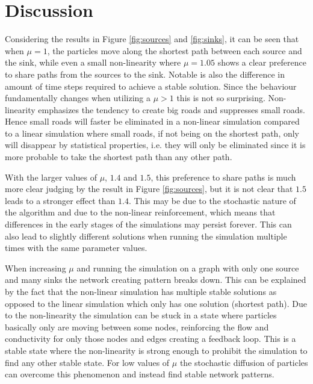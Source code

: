 \section{Discussion}
\label{sec:discussion}
Considering the results in Figure \ref{fig:sources} and \ref{fig:sinks}, it can be seen that when $\mu = 1$, the particles move along the shortest path between each source and the sink, while even a small non-linearity where $\mu = 1.05$ shows a clear preference to share paths from the sources to the sink. Notable is also the difference in amount of time steps required to achieve a stable solution. Since the behaviour fundamentally changes when utilizing a $\mu > 1$ this is not so surprising. Non-linearity emphasizes the tendency to create big roads and suppresses small roads. Hence small roads will faster be eliminated in a non-linear simulation compared to a linear simulation where small roads, if not being on the shortest path, only will disappear by statistical properties, i.e. they will only be eliminated since it is more probable to take the shortest path than any other path. 

With the larger values of $\mu$, $1.4$ and $1.5$, this preference to share paths is much more clear judging by the result in Figure \ref{fig:sources}, but it is not clear that $1.5$ leads to a stronger effect than $1.4$. This may be due to the stochastic nature of the algorithm and due to the non-linear reinforcement, which means that differences in the early stages of the simulations may persist forever. This can also lead to slightly different solutions when running the simulation multiple times with the same parameter values.

When increasing $\mu$ and running the simulation on a graph with only one source and many sinks the network creating pattern breaks down. This can be explained by the fact that the non-linear simulation has multiple stable solutions as opposed to the linear simulation which only has one solution (shortest path). Due to the non-linearity the simulation can be stuck in a state where particles basically only are moving between some nodes, reinforcing the flow and conductivity for only those nodes and edges creating a feedback loop. This is a stable state where the non-linearity is strong enough to prohibit the simulation to find any other stable state. For low values of $\mu$ the stochastic diffusion of particles can overcome this phenomenon and instead find stable network patterns. 

